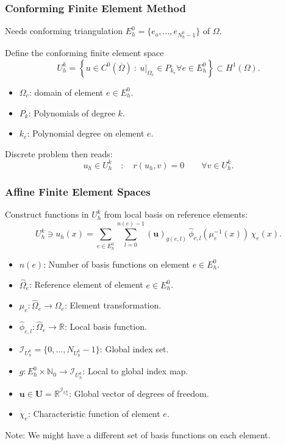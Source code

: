 \begin{frame}
\frametitle{Conforming Finite Element Method}
Needs conforming triangulation $E_h^0 = \{e_o,\ldots,e_{N_h^0-1} \}$ of $\Omega$. 

Define the conforming finite element space
\begin{equation*}
U_h^k = \left\{  u\in C^0(\overline{\Omega}) \ : \ u|_{\Omega_e} \in P_{k_e} \forall e\in E_h^0\right\} \subset H^1(\Omega).
\end{equation*}
\begin{itemize}
\item $\Omega_e$: domain of element $e\in E_h^0$.
\item $P_k$: Polynomials of degree $k$.
\item $k_e$: Polynomial degree on element $e$.
\end{itemize}
Discrete problem then reads:
\begin{equation*}
u_h \in U_h^k \quad : \quad r(u_h,v) = 0 \qquad \forall v \in U_h^k.
\end{equation*}
\end{frame}

\begin{frame}
\frametitle{Affine Finite Element Spaces}
Construct functions in $U_h^k$ from local basis on reference elements:
\begin{equation*}
U_h^k\ni u_h(x) = \sum_{e\in E_h^0} \sum_{l=0}^{n(e)-1} (\mathbf{u})_{g(e,l)}
\, \hat{\phi}_{e,l}(\mu_e^{-1}(x)) \, \chi_e(x).
\end{equation*}
\begin{itemize}
\item $n(e)$: Number of basis functions on element $e\in E_h^0$.
\item $\hat\Omega_e$: Reference element of element $e\in E_h^0$.
\item $\mu_e : \hat\Omega_e \to \Omega_e$: Element transformation.
\item $\hat\phi_{e,l} : \hat\Omega_e \to \mathbb{R}$: Local basis function.
\item $\mathcal{I}_{U_h^k} = \{0,\ldots,N_{U_h^k}-1\}$: Global index set.
\item $g : E_h^0 \times \mathbb{N}_0 \to \mathcal{I}_{U_h^k}$: Local to global index map.
\item $\mathbf{u} \in \mathbf{U} = \mathbb{R}^{\mathcal{I}_{U_h^k}}$: Global vector of degrees of freedom.
\item $\chi_e$: Characteristic function of element $e$.
\end{itemize}
Note: We might have a different set of basis functions on each element.
\end{frame}

